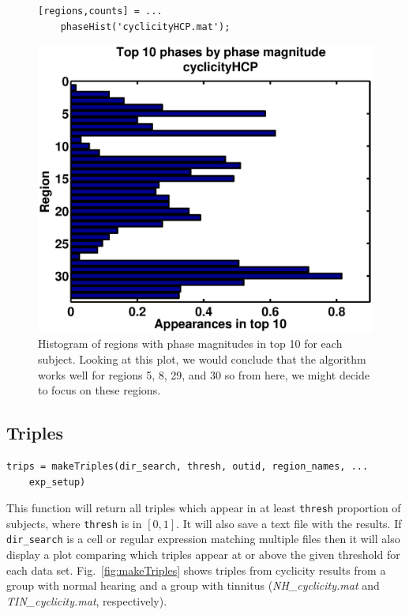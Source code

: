 \documentclass[11pt]{article}
\def\f{Fig.}
\begin{document}
\begin{figure}
\begin{minipage}{.55\linewidth}
\begin{lstlisting}
[regions,counts] = ...
	phaseHist('cyclicityHCP.mat');
\end{lstlisting}
\end{minipage}
\hfill
\begin{minipage}{.45\linewidth}
\includegraphics[width=\linewidth]{figs/phaseHist.eps}
\end{minipage}
\caption{Histogram of regions with phase magnitudes in top 10 for each subject. Looking at this plot, we would conclude that the algorithm works well for regions 5, 8, 29, and 30 so from here, we might decide to focus on these regions.}
\end{figure}

\subsection{Triples}

\begin{lstlisting}[frame=single]
trips = makeTriples(dir_search, thresh, outid, region_names, ...
    exp_setup)
\end{lstlisting}

This function will return all triples which appear in at least \verb|thresh| proportion of subjects, where \verb|thresh| is in $[0,1].$ It will also save a text file with the results. If \verb|dir_search| is a cell or regular expression matching multiple files then it will also display a plot comparing which triples appear at or above the given threshold for each data set. \f~\ref{fig:makeTriples} shows triples from cyclicity results from a group with normal hearing and a group with tinnitus (\textit{NH\_cyclicity.mat} and \textit{TIN\_cyclicity.mat}, respectively).
\end{document}
